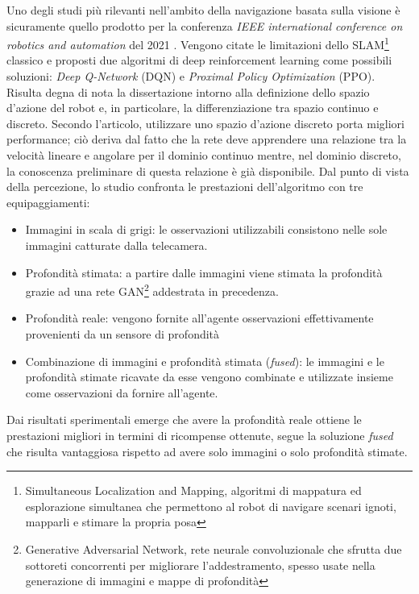 Uno degli studi più rilevanti nell'ambito della navigazione basata sulla visione è sicuramente quello prodotto per la conferenza \textit{IEEE international conference on robotics and automation} del 2021 \cite{wenzel2021vision}. Vengono citate le limitazioni dello SLAM\footnote{Simultaneous Localization and Mapping, algoritmi di mappatura ed esplorazione simultanea che permettono al robot di navigare scenari ignoti, mapparli e stimare la propria posa} classico e proposti due algoritmi di deep reinforcement learning come possibili soluzioni: \textit{Deep Q-Network} (DQN) e \textit{Proximal Policy Optimization} (PPO). Risulta degna di nota la dissertazione intorno alla definizione dello spazio d'azione del robot e, in particolare, la differenziazione tra spazio continuo e discreto. Secondo l'articolo, utilizzare uno spazio d'azione discreto porta  migliori performance; ciò deriva dal fatto che la rete deve apprendere una relazione tra la velocità lineare e angolare per il dominio continuo mentre, nel dominio discreto, la conoscenza preliminare di questa relazione è già disponibile. Dal punto di vista della percezione, lo studio confronta le prestazioni dell'algoritmo con tre equipaggiamenti:

\begin{itemize}
    \item Immagini in scala di grigi: le osservazioni utilizzabili consistono nelle sole immagini catturate dalla telecamera.
    \item Profondità stimata: a partire dalle immagini viene stimata la profondità grazie ad una rete GAN\footnote{Generative Adversarial Network, rete neurale convoluzionale che sfrutta due sottoreti concorrenti per migliorare l'addestramento, spesso usate nella generazione di immagini e mappe di profondità} addestrata in precedenza.
    \item Profondità reale: vengono fornite all'agente osservazioni effettivamente provenienti da un sensore di profondità
    \item Combinazione di immagini e profondità stimata (\textit{fused}): le immagini e le profondità stimate ricavate da esse vengono combinate e utilizzate insieme come osservazioni da fornire all'agente.
\end{itemize}

Dai risultati sperimentali emerge che avere la profondità reale ottiene le prestazioni migliori in termini di ricompense ottenute, segue la soluzione \textit{fused} che risulta vantaggiosa rispetto ad avere solo immagini o solo profondità stimate.

